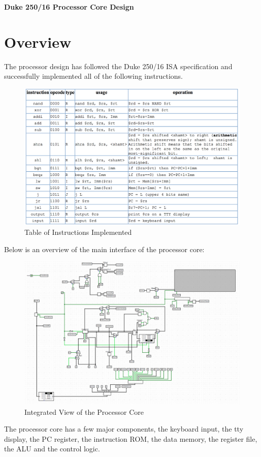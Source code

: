 \documentclass{article}
\begin{document}
	\begin{center}
		{\bf \Large Duke 250/16 Processor Core Design}
	\end{center}
	\section{Overview}
	The processor design has followed the Duke 250/16 ISA specification and successfully implemented all of the following instructions.
	\begin{figure}[H]
		\begin{center}
			\includegraphics[scale=0.5]{ins}
			\caption{Table of Instructions Implemented}
		\end{center}
	\end{figure}
	\clearpage
	Below is an overview of the main interface of the processor core:
	\begin{figure}[H]
		\begin{center}
			\includegraphics[scale=0.5]{cpu}
			\caption{Integrated View of the Processor Core}
		\end{center}
	\end{figure}
	The processor core has a few major components, the keyboard input, the tty display, the PC register, the instruction ROM, the data memory, the register file, the ALU and the control logic.
	\clearpage
\end{document}
